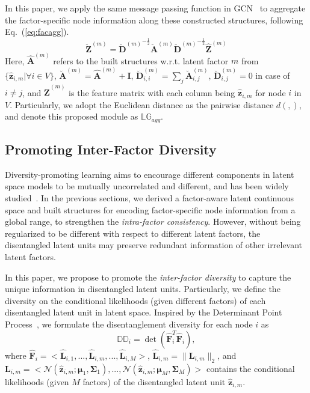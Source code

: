 \documentclass[accepted]{uai2021} %
\begin{document}
In this paper, we apply the same message passing function in GCN~\citep{Kipf2017SemiSupervisedCW} to aggregate the factor-specific node information along these constructed structures, following Eq.~(\ref{eq:facagg}).
\begin{equation} \label{eq:facagg}
\breve{\mathbf{Z}}^{(m)} = {\breve{\mathbf{D}}^{(m)}}^{-\frac{1}{2}}\breve{\mathbf{A}}^{(m)}{\breve{\mathbf{D}}^{(m)}}^{-\frac{1}{2}}\hat{\mathbf{Z}}^{(m)}
\end{equation}
Here, $\hat{\mathbf{A}}^{(m)}$ refers to the built structures w.r.t. latent factor $m$ from $\{\hat{\mathbf{z}}_{i,m}| \forall i \in V\}$, $\breve{\mathbf{A}}^{(m)}=\hat{\mathbf{A}}^{(m)} + \mathbf{I}$, $\breve{\mathbf{D}}^{(m)}_{i,i}=\sum_j\breve{\mathbf{A}}^{(m)}_{i, j}$, $\breve{\mathbf{D}}^{(m)}_{i,j}=0$ in case of $i\neq j$, and $\hat{\mathbf{Z}}^{(m)}$ is the feature matrix with each column being $\hat{\mathbf{z}}_{i,m}$ for node $i$ in $V$. 
Particularly, we adopt the Euclidean distance as the pairwise distance $d(,)$, and denote this proposed module as $\mathbb{LG}_{agg}$.

\subsection{Promoting Inter-Factor Diversity}
Diversity-promoting learning aims to encourage different components in latent space models to be mutually uncorrelated and different, and has been widely
studied~\citep{Xie2018DiversityPromotingAL,Xie2016DiversityLT}. In the previous sections, we derived a factor-aware latent continuous space and built structures for encoding factor-specific node information from a global range, to strengthen the \emph{intra-factor consistency}. However, without being regularized to be different with respect to different latent factors, the disentangled latent units may preserve redundant information of other irrelevant latent factors.

In this paper, we propose to promote the \emph{inter-factor diversity} to capture the unique information in disentangled latent units. Particularly, we define the diversity on the conditional likelihoods (given different factors) of each disentangled latent unit in latent space. Inspired by the Determinant Point Process~\citep{Kulesza2012DeterminantalPP}, we formulate the disentanglement diversity for each node $i$ as
\begin{equation}
\mathbb{DD}_i = \det(\hat{\mathbf{F}}_i^{T}\hat{\mathbf{F}}_i) \label{eq:DD},
\end{equation}
where $\hat{\mathbf{F}}_i = <\hat{\mathbf{L}}_{i,1},...,\hat{\mathbf{L}}_{i,m},...,\hat{\mathbf{L}}_{i,M}>$, $\hat{\mathbf{L}}_{i,m}=\|\mathbf{L}_{i,m}\|_2$, and $\mathbf{L}_{i,m}=<\mathcal{N}(\hat{\mathbf{z}}_{i,m};\boldsymbol{\mu}_1, \boldsymbol{\Sigma}_1),...,\mathcal{N}(\hat{\mathbf{z}}_{i,m};\boldsymbol{\mu}_M, \boldsymbol{\Sigma}_M)>$ contains the conditional likelihoods (given $M$ factors) of the disentangled latent unit $\hat{\mathbf{z}}_{i,m}$.
\end{document}
